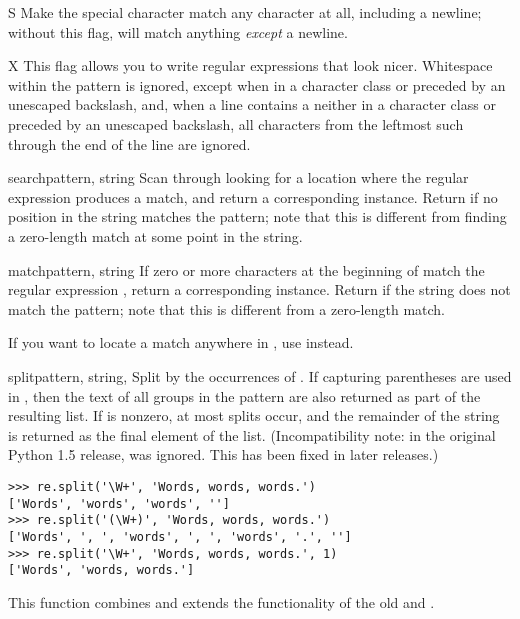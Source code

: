 \begin{datadesc}{S}
Make the  special character match any character at all, including a
newline; without this flag,  will match anything \emph{except}
a newline.
\end{datadesc}

\begin{datadesc}{X}
This flag allows you to write regular expressions that look nicer.
Whitespace within the pattern is ignored, 
except when in a character class or preceded by an unescaped
backslash, and, when a line contains a \character{\#} neither in a character
class or preceded by an unescaped backslash, all characters from the
leftmost such \character{\#} through the end of the line are ignored.
\end{datadesc}


\begin{funcdesc}{search}{pattern, string}
  Scan through  looking for a location where the regular
  expression  produces a match, and return a
  corresponding  instance.
  Return  if no
  position in the string matches the pattern; note that this is
  different from finding a zero-length match at some point in the string.
\end{funcdesc}

\begin{funcdesc}{match}{pattern, string}
  If zero or more characters at the beginning of  match
  the regular expression , return a corresponding
   instance.  Return  if the string does not
  match the pattern; note that this is different from a zero-length
  match.

    If you want to locate a match anywhere in
  , use  instead.
\end{funcdesc}

\begin{funcdesc}{split}{pattern, string, }
  Split  by the occurrences of .  If
  capturing parentheses are used in , then the text of all
  groups in the pattern are also returned as part of the resulting list.
  If  is nonzero, at most  splits
  occur, and the remainder of the string is returned as the final
  element of the list.  (Incompatibility note: in the original Python
  1.5 release,  was ignored.  This has been fixed in
  later releases.)

\begin{verbatim}
>>> re.split('\W+', 'Words, words, words.')
['Words', 'words', 'words', '']
>>> re.split('(\W+)', 'Words, words, words.')
['Words', ', ', 'words', ', ', 'words', '.', '']
>>> re.split('\W+', 'Words, words, words.', 1)
['Words', 'words, words.']
\end{verbatim}

  This function combines and extends the functionality of
  the old  and .
\end{funcdesc}

